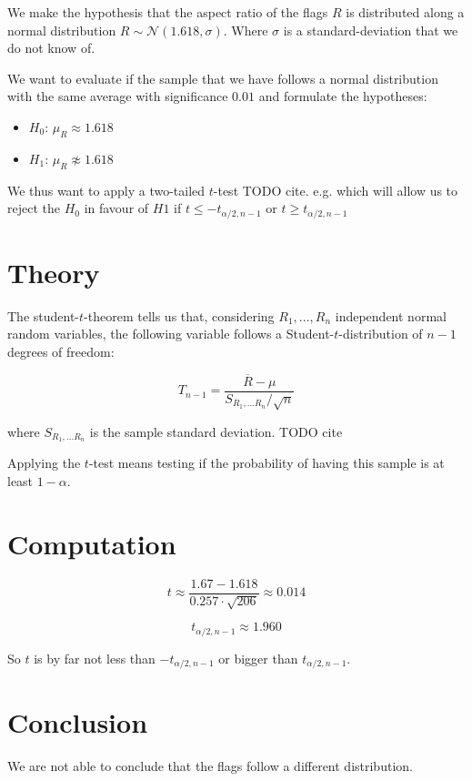 \documentclass{article}
\begin{document}
We make the hypothesis that the aspect ratio of the flags $R$ is distributed along a normal distribution $R\sim {\mathcal{N}}(1.618,\sigma)$. Where $\sigma$ is a standard-deviation that we do not know of.

We want to evaluate if the sample that we have follows a normal distribution with the same average with significance $0.01$
and formulate the hypotheses:
\begin{itemize}
\item $H_0$: $\mu_R \approx 1.618$
\item $H_1$: $\mu_R \not\approx 1.618$
\end{itemize}

We thus want to apply a two-tailed $t$-test TODO cite. e.g. \cite[theorem 7.4.2]{Larson-Marx} which will allow us
to reject the $H_0$ in favour of $H1$ if $t\leqslant -t_{\alpha/2,n-1}$ or $t\geqslant t_{\alpha/2,n-1}$



\section{Theory}

The student-$t$-theorem tells us that, considering $R_1, ..., R_n$ independent normal random variables, the following
variable follows a Student-$t$-distribution of $n-1$ degrees of freedom:

$$T_{n-1}=\frac{\overline{R}-\mu}{S_{R_1,...R_n}/\sqrt{n}}$$

where $S_{R_1,...R_n}$ is the sample standard deviation. TODO cite

Applying the $t$-test means testing if the probability of having this sample is at least $1-\alpha$.

\section{Computation}

$$t \approx \frac{1.67-1.618}{0.257\cdot\sqrt{206}} \approx 0.014$$

$$t_{\alpha/2,n-1} \approx 1.960$$

So $t$ is by far not less than $-t_{\alpha/2,n-1}$ or bigger than $t_{\alpha/2,n-1}$.



\section{Conclusion}

We are not able to conclude that the flags follow a different distribution.




\end{document}
